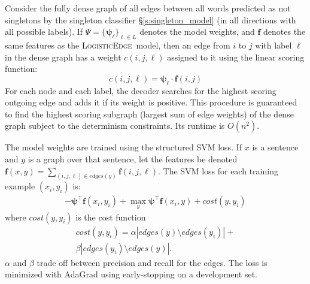 \documentclass[11pt]{article}
\DeclareMathOperator*{\argmax}{arg\,max}
\newcommand{\nas}[1]{\textcolor{red}{[#1 -NAS]}}
\renewcommand{\nas}[1]{}
\newcommand{\logitedge}{\textsc{LogisticEdge}}
\begin{document}
Consider the fully dense graph of all edges between all words predicted
as not singletons by the singleton classifier \S\ref{s:singleton_model} (in all
directions with all possible labels).
If $\Psi = \{\bm\psi_\ell\}_{\ell \in L}$ denotes the model
weights, and $\bm{f}$ denotes the same features as the
\logitedge~model, then an edge from $i$ to $j$ with label $\ell$ in the
dense graph has a weight $c(i,j,\ell)$ assigned to it using the linear
scoring function: \nas{no-edge is not included here, I am guessing.
  say so explicitly since this is a subtle difference with the logit model}
\[
c(i,j,\ell) = \bm\psi_\ell \cdot \bm{f}(i,j)
\]
For each node and each label, the decoder searches for
the highest scoring outgoing edge and adds it if its weight is
positive.
This procedure is guaranteed to find the highest scoring subgraph (largest sum
of edge weights) of the dense graph subject to the determinism constraints.
Its runtime is $O(n^2)$.



The model weights are trained using the structured SVM loss.  If $x$
is a sentence and $y$ is a graph over that sentence, let the features 
be denoted $\bm{f}(x,y) = \sum_{(i,j,\ell) \in edges(y)}
\bm{f}(i,j,\ell)$.  The SVM loss for each training example $(x_i, y_i)$ is:
\begin{multline*}
-\bm\psi^\top \bm{f}(x_i,y_i) + \max_{y} \bm\psi^\top \bm{f}(x_i,y) +
\mathit{cost}(y,y_i)
\end{multline*}
where $\mathit{cost}(y,y_i)$
is the cost function
\begin{multline*}
\mathit{cost}(y,y_i) = \alpha |edges(y)\setminus edges(y_i)| + \\
\beta |edges(y_i)\setminus edges(y)|.
\end{multline*}
$\alpha$ and $\beta$ trade off between precision and recall for the
edges.  The loss is minimized with AdaGrad
using early-stopping on a development set. %
\end{document}
